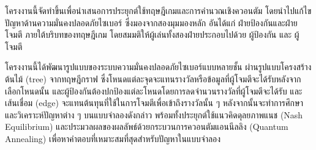 \maketitle
\makesignature

\ifproject

\begin{abstractTH}
\hspace{1.5em}โครงงานนี้จัดทำขึ้นเพื่อนำเสนอการประยุกต์ใช้ทฤษฎีเกมและการคำนวณเชิงควอนตัม โดยนำไปแก้ไขปัญหาด้านความมั่นคงปลอดภัยไซเบอร์ ซึ่งมองจากสองมุมมองหลัก อันได้แก่ ฝ่ายป้องกันและฝ่ายโจมตี ภายใต้บริบทของทฤษฎีเกม โดยสมมติให้ผู้เล่นทั้งสองฝ่ายประกอบไปด้วย ผู้ป้องกัน และ ผู้โจมตี 

โครงงานนี้ได้พัฒนารูปแบบของระบบความมั่นคงปลอดภัยไซเบอร์แบบหลายชั้น ผ่านรูปแบบโครงสร้างต้นไม้ (tree) จากทฤษฎีกราฟ ซึ่งโหนดแต่ละจุดจะแทนรางวัลหรือข้อมูลที่ผู้โจมตีจะได้รับหลังจากเลือกโหนดนั้น และผู้ป้องกันต้องปกป้องแต่ละโหนดโดยการลดจำนวนรางวัลที่ผู้โจมตีจะได้รับ และเส้นเชื่อม (edge) จะแทนต้นทุนที่ใช้ในการโจมตีเพื่อเข้าถึงรางวัลนั้น ๆ หลังจากนั้นจะทำการศึกษาและวิเคราะห์ปัญหาต่าง ๆ บนแบบจำลองดังกล่าว พร้อมทั้งประยุกต์ใช้แนวคิดดุลยภาพแนช (Nash Equilibrium) และประมวลผลของผลลัพธ์ด้วยกระบวนการควอนตัมแอนนีลลิง (Quantum Annealing) เพื่อหาคำตอบที่เหมาะสมที่สุดสำหรับปัญหาในแบบจำลอง
\end{abstractTH}

\begin{abstract}
\hspace{1.5em}This project is conducted to present the application of game theory and quantum computation to address cybersecurity issues from two main perspectives: the defender and the attacker, within the framework of game theory. The model assumes two players, namely the defender and the attacker.

The project develops a multi-layered cybersecurity system represented through a tree structure based on graph theory. Each node represents a reward or information that the attacker may obtain upon selecting that node, while the defender’s role is to protect each node by reducing the rewards accessible to the attacker. The edges represent the costs incurred by the attacker to reach the corresponding rewards. Subsequently, the project investigates and analyzes problems within this model, applying the concept of Nash Equilibrium and leveraging Quantum Annealing to process the results. This approach aims to determine the optimal solution for the modeled problem.
\end{abstract}

